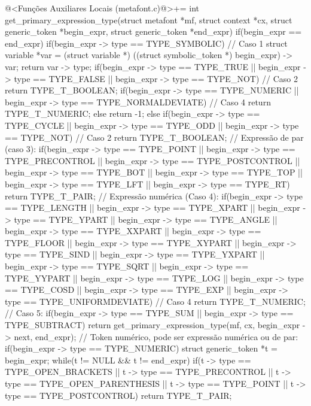 {{{{{{\iniciocodigo
@<Funções Auxiliares Locais (metafont.c)@>+=
int get_primary_expression_type(struct metafont *mf, struct context *cx,
                               struct generic_token *begin_expr,
                               struct generic_token *end_expr){
  if(begin_expr == end_expr){
    if(begin_expr -> type == TYPE_SYMBOLIC){ // Caso 1
      struct variable *var = (struct variable *)
                               ((struct symbolic_token *) begin_expr) -> var;
      return var -> type;
    }
    if(begin_expr -> type == TYPE_TRUE || begin_expr -> type == TYPE_FALSE ||
       begin_expr -> type == TYPE_NOT) // Caso 2
      return TYPE_T_BOOLEAN;
    if(begin_expr -> type == TYPE_NUMERIC ||
       begin_expr -> type == TYPE_NORMALDEVIATE) // Caso 4
      return TYPE_T_NUMERIC;
    else
      return -1;
  }
  else{
    if(begin_expr -> type == TYPE_CYCLE || begin_expr -> type == TYPE_ODD ||
       begin_expr -> type == TYPE_NOT) // Caso 2
      return TYPE_T_BOOLEAN;
    // Expressão de par (caso 3):
    if(begin_expr -> type == TYPE_POINT ||
       begin_expr -> type == TYPE_PRECONTROL ||
       begin_expr -> type == TYPE_POSTCONTROL ||
       begin_expr -> type == TYPE_BOT || begin_expr -> type == TYPE_TOP ||
       begin_expr -> type == TYPE_LFT || begin_expr -> type == TYPE_RT)
      return TYPE_T_PAIR;    
    // Expressão numérica (Caso 4):
    if(begin_expr -> type == TYPE_LENGTH || begin_expr -> type == TYPE_XPART ||
       begin_expr -> type == TYPE_YPART || begin_expr -> type == TYPE_ANGLE ||
       begin_expr -> type == TYPE_XXPART || begin_expr -> type == TYPE_FLOOR ||
       begin_expr -> type == TYPE_XYPART || begin_expr -> type == TYPE_SIND ||
       begin_expr -> type == TYPE_YXPART || begin_expr -> type == TYPE_SQRT ||
       begin_expr -> type == TYPE_YYPART || begin_expr -> type == TYPE_LOG ||
       begin_expr -> type == TYPE_COSD ||   begin_expr -> type == TYPE_EXP ||
       begin_expr -> type == TYPE_UNIFORMDEVIATE) // Caso 4
      return TYPE_T_NUMERIC;
    // Caso 5:
    if(begin_expr -> type == TYPE_SUM || begin_expr -> type == TYPE_SUBTRACT)
      return get_primary_expression_type(mf, cx, begin_expr -> next, end_expr);
    // Token numérico, pode ser expressão numérica ou de par:
    if(begin_expr -> type == TYPE_NUMERIC){
      struct generic_token *t = begin_expr;
      while(t != NULL && t != end_expr){
        if(t -> type == TYPE_OPEN_BRACKETS || t -> type == TYPE_PRECONTROL ||
           t -> type == TYPE_OPEN_PARENTHESIS || t -> type == TYPE_POINT ||
           t -> type == TYPE_POSTCONTROL)
          return TYPE_T_PAIR;
}}}}}}}}}}
